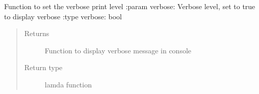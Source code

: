 \documentclass[letterpaper,10pt,english]{sphinxmanual}
\begin{document}

\begin{fulllineitems}
\label{\detokenize{index:fullwaveqc.tools.set_verbose}}
Function to set the verbose print level
:param verbose: Verbose level, set to true to display verbose
:type verbose: bool
\begin{quote}\begin{description}
\item[{Returns}] \leavevmode
{} \textendash{} Function to display verbose message in console

\item[{Return type}] \leavevmode
lamda function

\end{description}\end{quote}

\end{fulllineitems}

\end{document}

